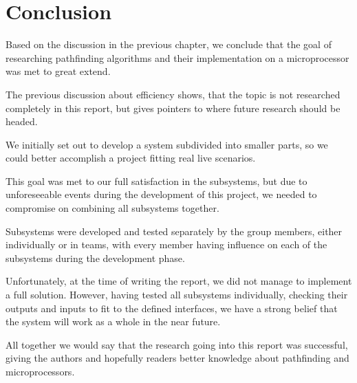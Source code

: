 \chapter{Conclusion}\label{ch:conclusion}
Based on the discussion in the previous chapter,
we conclude that the goal of researching pathfinding algorithms and their implementation on a microprocessor was met to great extend.

The previous discussion about efficiency shows,
that the topic is not researched completely in this report,
but gives pointers to where future research should be headed.

We initially set out to develop a system subdivided into smaller parts,
so we could better accomplish a project fitting real live scenarios.

This goal was met to our full satisfaction in the subsystems,
but due to unforeseeable events during the development of this project,
we needed to compromise on combining all subsystems together.

Subsystems were developed and tested separately by the group members,
either individually or in teams,
with every member having influence on each of the 
subsystems during the development phase.

Unfortunately, at the time of writing the report,
we did not manage to implement a full solution.
However, having tested all subsystems individually,
checking their outputs and inputs to fit to the defined interfaces,
we have a strong belief that the system will work as a whole in the near future.

All together we would say that the research going into this report was successful,
giving the authors and hopefully readers better knowledge about pathfinding and microprocessors.